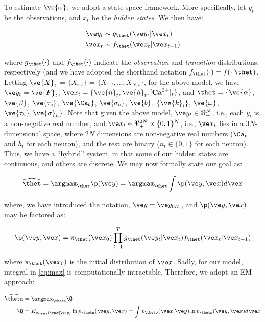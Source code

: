 To estimate $\ve{\omega}$, we adopt a state-space framework.  More specifically, let $y_t$ be the observations, and $x_t$ be the \emph{hidden states}.   We then have:

\begin{align}
\y_t &\sim \g (\y_t | \x_t) \label{eq:y_t} \\
\x_t &\sim \f (\x_t | \x_{t-1}) \label{eq:x_t}
\end{align}

\noindent where $\g(\cdot)$ and $\f(\cdot)$ indicate the \emph{observation} and \emph{transition} distributions, respectively (and we have adopted the shorthand notation $\f(\cdot)=f(\cdot | \thet)$.  Letting $\ve{X}_t$ = $\{X_{i,t}\}$ = $\{X_{1,t}, \ldots, X_{N,t}\}$, for the above model, we have $\y_t=\ve{F}_t$, $\x_t=\{\ve{n}_t, \ve{h}_t, [\textbf{Ca}^{2+}]_t\}$, and $\thet=\{\ve{\alpha}$, $\ve{\beta}$, $\ve{\tau_c}$, $\ve{\Ca_b}$, $\ve{\sigma_c}$, $\ve{b}$, $\{\ve{k}_i\}$, $\ve{\omega}$, $\ve{\tau_h}, \ve{\sigma}_h\}$.   Note that given the above model, $\y_t \in \Re_+^N$, i.e., each $y_t$ is a non-negative real number, and $\x_t \in \Re_+^{2N} \times \{0,1\}^N$, i.e., $\x_t$ lies in a $3N$-dimensional space, where $2N$ dimensions are non-negative real numbers ($\Ca_t$ and $h_t$ for each neuron), and the rest are binary ($n_t \in \{0,1\}$ for each neuron).  Thus, we have a ``hybrid'' system, in that some of our hidden states are continuous, and others are discrete.  We may now formally state our goal as:

\begin{align} \label{eq:max}
\widehat{\thet} = \argmax_{\thet} \p(\yT) = \argmax_{\thet} \int \p(\yT, \xT) d\xT 
\end{align}

\noindent where, we have introduced the notation, $\yT=\y_{0:T}$, and $\p(\yT, \xT)$ may be factored as: 

\begin{align}
\p(\yT, \xT) = \ppi (\x_0) \prod_{t=1}^T \g(\y_t | \x_t) \f(\x_t | \x_{t-1}) 
\end{align}

\noindent where $\ppi(\x_0)$ is the initial distribution of $\x$.  Sadly, for our model, integral in \eqref{eq:max} is computationally intractable. Therefore, we adopt an EM approach:

\begin{align}
\widehat{\thetn} &= \argmax_{\thetn} \Q\\
\Q &= E_{p_{\theto}(\xT | \yT)} \ln p_{\thetn} (\yT, \xT)%
= \int p_{\theto} (\xT | \yT) \ln p_{\thetn} (\yT, \xT) d\xT 
\end{align}

